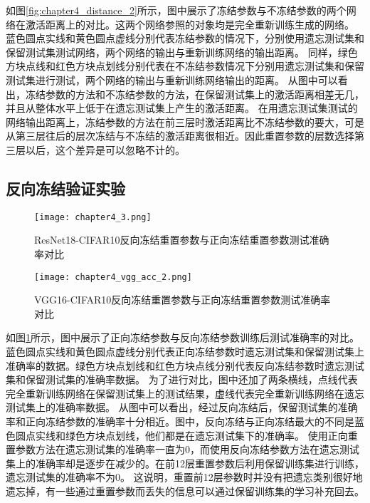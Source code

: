 如图\ref{fig:chapter4_distance_2}所示，图中展示了冻结参数与不冻结参数的两个网络在激活距离上的对比。这两个网络参照的对象均是完全重新训练生成的网络。
蓝色圆点实线和黄色圆点虚线分别代表冻结参数的情况下，分别使用遗忘测试集和保留测试集测试网络，两个网络的输出与重新训练网络的输出距离。
同样，绿色方块点线和红色方块点划线分别代表在不冻结参数情况下分别用遗忘测试集和保留测试集进行测试，两个网络的输出与重新训练网络输出的距离。
从图中可以看出，冻结参数的方法和不冻结参数的方法，在保留测试集上的激活距离相差无几，并且从整体水平上低于在遗忘测试集上产生的激活距离。
在用遗忘测试集测试的网络输出距离上，冻结参数的方法在前三层时激活距离比不冻结参数的要大，可是从第三层往后的层次冻结与不冻结的激活距离很相近。因此重置参数的层数选择第三层以后，这个差异是可以忽略不计的。

\subsection{反向冻结验证实验}
\begin{figure}
    \centering
    \texttt{[image: chapter4\_3.png]}
    \caption{ResNet18-CIFAR10反向冻结重置参数与正向冻结重置参数测试准确率对比}
    \label{fig:chapter4_3}
\end{figure}

\begin{figure}
    \centering
    \texttt{[image: chapter4\_vgg\_acc\_2.png]}
    \caption{VGG16-CIFAR10反向冻结重置参数与正向冻结重置参数测试准确率对比}
    \label{fig:chapter4_vgg_acc_2}
\end{figure}

如图\ref{fig:chapter4_3}所示，图中展示了正向冻结参数与反向冻结参数训练后测试准确率的对比。
蓝色圆点实线和黄色圆点虚线分别代表正向冻结参数时遗忘测试集和保留测试集上准确率的数据。绿色方块点划线和红色方块点线分别代表反向冻结参数时遗忘测试集和保留测试集的准确率数据。
为了进行对比，图中还加了两条横线，点线代表完全重新训练网络在保留测试集上的测试结果，虚线代表完全重新训练网络在遗忘测试集上的准确率数据。
从图中可以看出，经过反向冻结后，保留测试集的准确率和正向冻结参数的准确率十分相近。图中，反向冻结与正向冻结最大的不同是蓝色圆点实线和绿色方块点划线，他们都是在遗忘测试集下的准确率。
使用正向重置参数方法在遗忘测试集的准确率一直为0，而使用反向冻结参数方法在遗忘测试集上的准确率却是逐步在减少的。在前12层重置参数后利用保留训练集进行训练，遗忘测试集的准确率不为0。
这说明，重置前12层参数时并没有把遗忘类别很好地遗忘掉，有一些通过重置参数而丢失的信息可以通过保留训练集的学习补充回去。

